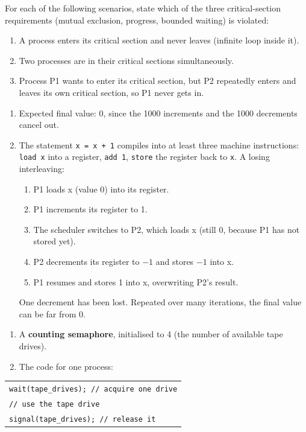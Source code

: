 \documentclass[11pt]{article}
\begin{document}
\begin{exercice}
For each of the following scenarios, state which of the three critical-section requirements (mutual exclusion, progress, bounded waiting) is violated:
\begin{enumerate}
  \item A process enters its critical section and never leaves (infinite loop inside it).
  \item Two processes are in their critical sections simultaneously.
  \item Process P1 wants to enter its critical section, but P2 repeatedly enters and leaves its own critical section, so P1 never gets in.
\end{enumerate}
\end{exercice}

\begin{corrige}[Exercise 1]
\begin{enumerate}
  \item Expected final value: 0, since the 1000 increments and the 1000 decrements cancel out.
  \item The statement \texttt{x = x + 1} compiles into at least three machine instructions: \texttt{load x} into a register, \texttt{add 1}, \texttt{store} the register back to \texttt{x}. A losing interleaving:
    \begin{enumerate}
      \item P1 loads x (value 0) into its register.
      \item P1 increments its register to 1.
      \item The scheduler switches to P2, which loads x (still 0, because P1 has not stored yet).
      \item P2 decrements its register to $-1$ and stores $-1$ into x.
      \item P1 resumes and stores 1 into x, overwriting P2's result.
    \end{enumerate}
    One decrement has been lost. Repeated over many iterations, the final value can be far from 0.
\end{enumerate}
\end{corrige}

\begin{corrige}[Exercise 2]
\begin{enumerate}
  \item A \textbf{counting semaphore}, initialised to 4 (the number of available tape drives).
  \item The code for one process:
\end{enumerate}
\begin{center}
\begin{tabular}{|l|}
\hline
\texttt{wait(tape\_drives); // acquire one drive} \\
\texttt{// use the tape drive} \\
\texttt{signal(tape\_drives); // release it} \\
\hline
\end{tabular}
\end{center}
\end{corrige}
\end{document}
